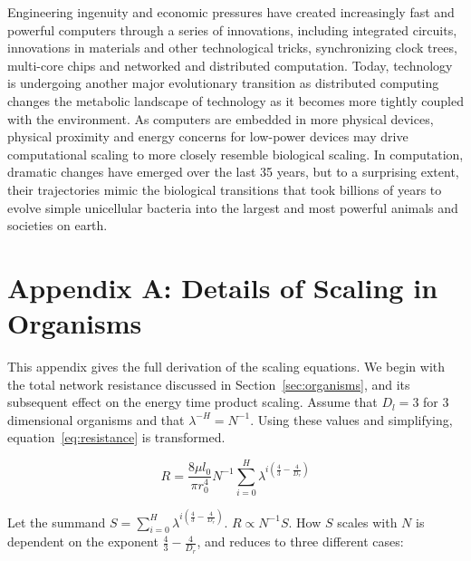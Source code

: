 \documentclass[12pt]{article}
\begin{document}
Engineering ingenuity and economic pressures have created increasingly
fast and powerful computers through a series of innovations, including
integrated circuits, innovations in materials and other technological
tricks, synchronizing clock trees, multi-core chips and networked and
distributed computation. Today, technology is undergoing another
major evolutionary transition as distributed computing changes the
metabolic landscape of technology as it becomes more tightly coupled with the
environment. As computers are embedded in more physical devices,
physical proximity and energy concerns for low-power devices may drive
computational scaling to more closely resemble biological scaling. In
computation, dramatic changes have emerged over the last 35 years, but
to a surprising extent, their trajectories mimic the biological
transitions that took billions of years to evolve simple unicellular
bacteria into the largest and most powerful animals and societies on
earth.


\newpage

\section{Appendix A: Details of Scaling in Organisms}
\label{sec:AppendixOrg}

This appendix gives the full derivation of the scaling equations.  We
begin with the total network resistance discussed in
Section~\ref{sec:organisms}, and its subsequent effect on the energy
time product scaling. Assume that $D_l = 3$ for $3$ dimensional
organisms and that $\lambda^{-H}=N^{-1}$.  Using these values and
simplifying, equation~\ref{eq:resistance} is transformed.

\begin{equation}
 R = \frac{8 \mu l_0}{\pi r_0^4} N^{-1} \sum_{i=0}^H \lambda^{i(\frac{4}{3} -\frac{4}{D_r})}
\end{equation}

Let the summand $S = \sum_{i=0}^H \lambda^{i(\frac{4}{3} -\frac{4}{D_r})}$. $R \propto
N^{-1} S$. How $S$ scales with $N$ is dependent on the exponent $\frac{4}{3} -
\frac{4}{D_r}$, and reduces to three different cases:
\end{document}
